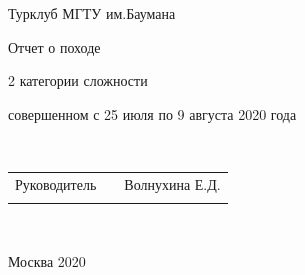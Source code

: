 \documentclass[]{article}
\begin{document}
	
\begin{center}
	\hfill \break
	\large{Турклуб МГТУ им.Баумана}\\
	


\begin{figure}[h!]
	

\end{figure}

	\hfill\break
	\hfill \break

	
	
	
	\large{Отчет о походе
		
		2 категории сложности
		
		совершенном с 25 июля по 9 августа 2020 года
		}\\
	\hfill \break
	\hfill \break
	\hfill \break
	
	\hfill \break
	
\end{center}

\hfill \break
\hfill \break

\normalsize{ 
	\begin{tabular}{ccc}
		
		
		Руководитель & \underline{\hspace{3cm}}& Волнухина Е.Д. \\\\
		
	
	\end{tabular}
}\\
\hfill \break
\hfill \break
\begin{center} Москва 2020 \end{center}
\thispagestyle{empty} %
	
\end{document}
